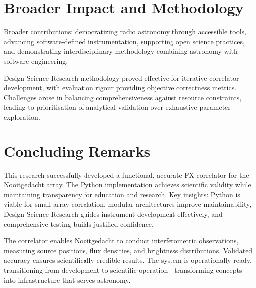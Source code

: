 \section{Broader Impact and Methodology}

Broader contributions: democratizing radio astronomy through accessible tools, advancing software-defined instrumentation, supporting open science practices, and demonstrating interdisciplinary methodology combining astronomy with software engineering.

Design Science Research methodology proved effective for iterative correlator development, with evaluation rigour providing objective correctness metrics. Challenges arose in balancing comprehensiveness against resource constraints, leading to prioritisation of analytical validation over exhaustive parameter exploration.

\section{Concluding Remarks}

This research successfully developed a functional, accurate FX correlator for the Nooitgedacht array. The Python implementation achieves scientific validity while maintaining transparency for education and research. Key insights: Python is viable for small-array correlation, modular architectures improve maintainability, Design Science Research guides instrument development effectively, and comprehensive testing builds justified confidence.

The correlator enables Nooitgedacht to conduct interferometric observations, measuring source positions, flux densities, and brightness distributions. Validated accuracy ensures scientifically credible results. The system is operationally ready, transitioning from development to scientific operation—transforming concepts into infrastructure that serves astronomy.